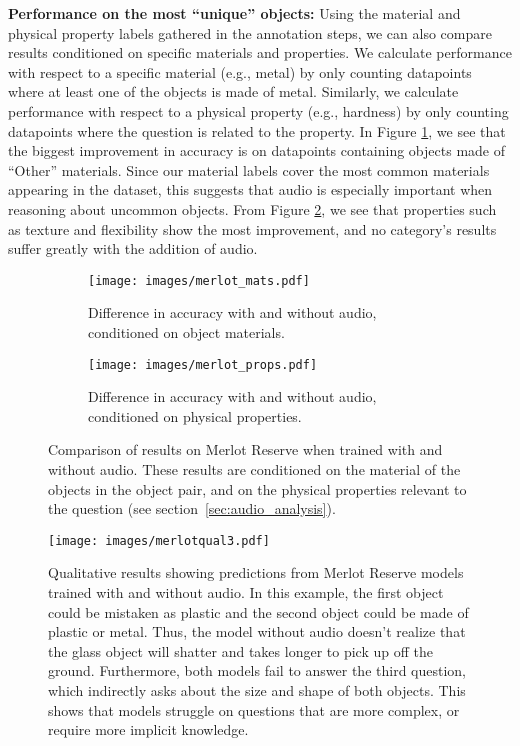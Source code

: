 \documentclass[runningheads]{llncs}
\begin{document}
\noindent \textbf{Performance on the most ``unique'' objects:} Using the material and physical property labels gathered in the annotation steps, we can also compare results conditioned on specific materials and properties. We calculate performance with respect to a specific material (e.g., metal) by only counting datapoints where at least one of the objects is made of metal. Similarly, we calculate performance with respect to a physical property (e.g., hardness) by only counting datapoints where the question is related to the property. In Figure \ref{fig:acc_merlot_mats}, we see that the biggest improvement in accuracy is on datapoints containing objects made of ``Other'' materials. Since our material labels cover the most common materials appearing in the dataset, this suggests that audio is especially important when reasoning about uncommon objects. From Figure \ref{fig:acc_merlot_props}, we see that properties such as texture and flexibility show the most improvement, and no category's results suffer greatly with the addition of audio.

\begin{figure}[t]
    \begin{subfigure}{0.48\textwidth}
        \centering
        \texttt{[image: images/merlot\_mats.pdf]}
        \caption{Difference in accuracy with and without audio, conditioned on object materials. }
        \label{fig:acc_merlot_mats}
    \end{subfigure}
    \hfill
    \begin{subfigure}{0.48\textwidth}
        \centering
        \texttt{[image: images/merlot\_props.pdf]}
        \caption{Difference in accuracy with and without audio, conditioned on physical properties. }
        \label{fig:acc_merlot_props}
    \end{subfigure}
    \label{fig:merlot_comp}
    \caption{Comparison of results on Merlot Reserve when trained with and without audio. These results are conditioned on the material of the objects in the object pair, and on the physical properties relevant to the question (see section~\ref{sec:audio_analysis}).}\end{figure}

\begin{figure}[t]
    \centering
\texttt{[image: images/merlotqual3.pdf]}
\caption{Qualitative results showing predictions from Merlot Reserve models trained with and without audio. In this example, the first object could be mistaken as plastic and the second object could be made of plastic or metal. Thus, the model without audio doesn't realize that the glass object will shatter and takes longer to pick up off the ground. Furthermore, both models fail to answer the third question, which indirectly asks about the size and shape of both objects. This shows that models struggle on questions that are more complex, or require more implicit knowledge.}\label{fig:qualitative}
\end{figure}
\end{document}
